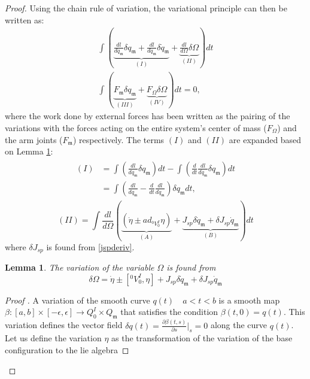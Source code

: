 \documentclass[lettersize,journal]{IEEEtran}
\newtheorem{lemma}[theorem]{Lemma}
\begin{document}
\begin{proof}[Proof]
Using the chain rule of variation, the variational principle can then be written as:
\begin{multline}
    \int (\underbrace{\frac{dl}{dq_\mathfrak{m}} \delta q_\mathfrak{m} +\frac{dl}{d\dot{q}_\mathfrak{m}} \delta \dot{q}_\mathfrak{m}}_{(I)} +\underbrace{\frac{dl}{d\Omega} \delta \Omega}_{(II)})dt\\
        \int (\underbrace{F_\mathfrak{m}\delta q_\mathfrak{m}}_{(III)} + \underbrace{F_\Omega \delta \Omega}_{(IV)})dt=0,
        \label{variationequation}
\end{multline}
where the work done by external forces has been written as the pairing of the variations with the forces acting on the entire system's center of mass ($F_\Omega$) and the arm joints ($F_\mathfrak{m}$) respectively. The terms $(I)$ and $(II)$ are expanded based on Lemma \ref{varlemma}:
\begin{align}
\begin{split}
     (I) &= \int (\frac{dl}{dq_\mathfrak{m}} \delta q_\mathfrak{m})dt -\int (\frac{d}{dt}\frac{dl}{d\dot{q}_\mathfrak{m}} \delta {q}_\mathfrak{m})dt \\
     &=\int (\frac{dl}{dq_\mathfrak{m}} -\frac{d}{dt}\frac{dl}{d\dot{q}_\mathfrak{m}} )\delta {q}_\mathfrak{m}dt ,
     \end{split}
     \label{lpart1}
\end{align}
\begin{equation}
    (II) = \int  \frac{d l}{d\Omega} (\underbrace{(\dot{\eta}\pm ad_{{}^0V^I_0} \eta)}_{(A)} + \underbrace{J_{sp}\delta \dot{q}_\mathfrak{m}+\delta J_{sp}\dot{q}_\mathfrak{m}}_{(B)})dt
    \label{lpart2}
\end{equation}
where $\delta J_{sp}$ is found from \eqref{jspderiv}.
\begin{lemma}\label{varlemma}
The variation of the variable $\Omega$ is found from
\begin{equation}
    \delta \Omega= \dot{\eta}\pm [{}^0V^I_0,\eta] + J_{sp}\delta \dot{q}_\mathfrak{m}+\delta J_{sp}\dot{q}_\mathfrak{m}
\end{equation}
\end{lemma}
\begin{proof}[Proof ]
A variation of the smooth curve $q(t) \quad a<t<b $ is a smooth map $\beta: [a,b]\times[-\epsilon,\epsilon]\rightarrow Q^I_0\times Q_\mathfrak{m}$ that  satisfies  the  condition $\beta(t,0)  =q(t)$.  This  variation defines the vector field $\delta q(t) =\frac{\partial \beta(t,s)}{\partial s} |_s=0 $ along the curve $q(t)$. Let us define the variation $\eta$ as the transformation of the variation of the base configuration to the lie algebra

\end{proof}
\end{proof}
\end{document}
